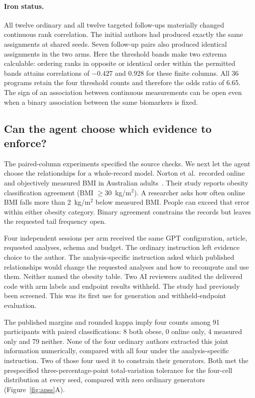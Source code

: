 \documentclass[sigconf,anonymous,review]{acmart}
\begin{document}
\paragraph{Iron status.}
All twelve ordinary and all twelve targeted follow-ups materially changed continuous rank correlation. The initial authors had produced exactly the same assignments at shared seeds. Seven follow-up pairs also produced identical assignments in the two arms. Here the threshold bands make two extrema calculable: ordering ranks in opposite or identical order within the permitted bands attains correlations of $-0.427$ and $0.928$ for these finite columns. All 36 programs retain the four threshold counts and therefore the odds ratio of 6.65. The sign of an association between continuous measurements can be open even when a binary association between the same biomarkers is fixed.

\subsection{Can the agent choose which evidence to enforce?}
\label{sec:apss}
The paired-column experiments specified the source checks. We next let the agent choose the relationships for a whole-record model. Norton et al.\ recorded online and objectively measured BMI in Australian adults~\cite{nortonapss}. Their study reports obesity classification agreement (BMI $\geq30$~kg/m$^2$). A researcher asks how often online BMI falls more than 2~kg/m$^2$ below measured BMI. People can exceed that error within either obesity category. Binary agreement constrains the records but leaves the requested tail frequency open.

Four independent sessions per arm received the same GPT configuration, article, requested analyses, schema and budget. The ordinary instruction left evidence choice to the author. The analysis-specific instruction asked which published relationships would change the requested analyses and how to recompute and use them. Neither named the obesity table. Two AI reviewers audited the delivered code with arm labels and endpoint results withheld. The study had previously been screened. This was its first use for generation and withheld-endpoint evaluation.

The published margins and rounded kappa imply four counts among 91 participants with paired classifications: 8 both obese, 0 online only, 4 measured only and 79 neither. None of the four ordinary authors extracted this joint information numerically, compared with all four under the analysis-specific instruction. Two of those four used it to constrain their generators. Both met the prespecified three-percentage-point total-variation tolerance for the four-cell distribution at every seed, compared with zero ordinary generators (Figure~\ref{fig:apss}A).
\end{document}
